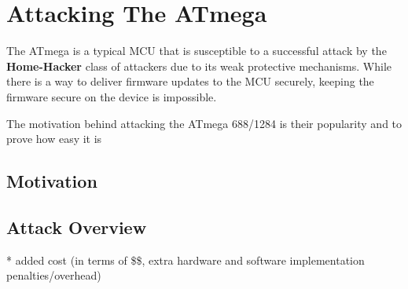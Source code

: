 \section{Attacking The ATmega}
\label{sec:attacking_mega}

The ATmega is a typical MCU that is susceptible to a successful attack by the \textbf{Home-Hacker} class of attackers due to its weak protective mechanisms. While there is a way to deliver firmware updates to the MCU securely\citep{tech:aes_bls}, keeping the firmware secure on the device is impossible.

The motivation behind attacking the ATmega 688/1284 is their popularity and to prove how easy it is


	\subsection{Motivation}
	
	\subsection{Attack Overview}
		* added cost (in terms of \$\$, extra hardware and software implementation penalties/overhead)